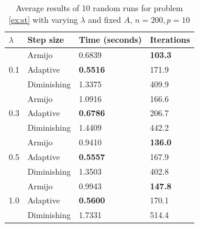 \documentclass[pdflatex,sn-mathphys-num]{sn-jnl}%
\theoremstyle{definition} %
\theoremstyle{remark} %
\begin{document}
\begin{table}[htbp]%
    \centering
    \caption{Average results of 10 random runs for problem \eqref{ex:st} with varying \( \lambda \) and fixed $A$, \( n = 200, p = 10 \)}
    \begin{tabular}{l p{2.5cm} p{2.5cm} p{2.5cm}}
        \toprule
        \( \lambda \) & Step size & Time (seconds) & Iterations \\
        \midrule
        \multirow{3}{*}{0.1} 
          & Armijo & 0.6839 & \textbf{103.3} \\
          & Adaptive & \textbf{0.5516} & 171.9 \\
          & Diminishing & 1.3375 & 409.9 \\
        \midrule
        \multirow{3}{*}{0.3} 
          & Armijo & 1.0916 & 166.6 \\
          & Adaptive & \textbf{0.6786} & 206.7 \\
          & Diminishing & 1.4409 & 442.2 \\
        \midrule
        \multirow{3}{*}{0.5} 
          & Armijo & 0.9410 & \textbf{136.0} \\
          & Adaptive & \textbf{0.5557} & 167.9 \\
          & Diminishing & 1.3503 & 402.8 \\
        \midrule
        \multirow{3}{*}{1.0} 
          & Armijo & 0.9943 & \textbf{147.8} \\
          & Adaptive & \textbf{0.5600} & 170.1 \\
          & Diminishing & 1.7331 & 514.4 \\
        \bottomrule
    \end{tabular}
    \label{experi_stiefel_lambda}
\end{table}
\end{document}
